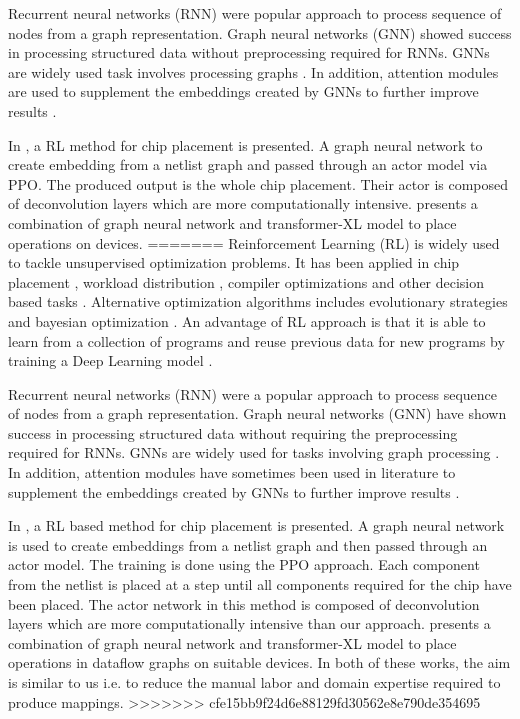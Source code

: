 Recurrent neural networks (RNN) \cite{hochreiter1996lstm} were popular approach to process sequence of nodes from a graph representation. 
Graph neural networks (GNN) \cite{gori2005new} showed success in processing structured data without preprocessing required for RNNs.
GNNs are widely used task involves processing graphs \cite{Zhou_compileGNN, zhou2019gdp}. 
In addition, attention modules are used to supplement the embeddings created by GNNs to further improve results \cite{addanki2019placeto}.

In \cite{mirhoseini2020chip}, a RL method for chip placement is presented. 
A graph neural network to create embedding from a netlist graph and passed through an actor model via PPO. 
The produced output is the whole chip placement. 
Their actor is composed of deconvolution layers which are more computationally intensive. 
\cite{zhou2019gdp} presents a combination of graph neural network and transformer-XL model to place operations on devices. 
=======
Reinforcement Learning (RL) is widely used to tackle unsupervised optimization problems. It has been applied in chip placement \cite{mirhoseini2020chip}, 
workload distribution \cite{Mirhoseini_placementRNN, addanki2019placeto, zhou2019gdp}, compiler optimizations \cite{Zhou_compileGNN} and 
other decision based tasks \cite{kormushev2013reinforcement, ZophL16_NASRL}. Alternative optimization algorithms includes 
evolutionary strategies \cite{Zhichao_ESNAS} and bayesian optimization \cite{shi2020learned}. An advantage of RL approach is that it is able to learn from a collection of programs and reuse previous data for new programs by training a Deep Learning model \cite{zhou2019gdp}.

Recurrent neural networks (RNN) \cite{hochreiter1996lstm} were a popular approach to process sequence of nodes from a graph representation. 
Graph neural networks (GNN) \cite{gori2005new} have shown success in processing structured data without requiring the preprocessing required for RNNs.
GNNs are widely used for tasks involving graph processing \cite{Zhou_compileGNN, zhou2019gdp}. 
In addition, attention modules have sometimes been used in literature to supplement the embeddings created by GNNs to further improve results \cite{addanki2019placeto}.

In \cite{mirhoseini2020chip}, a RL based method for chip placement is presented. A graph neural network is used to create embeddings from a netlist graph and then passed through an actor model. The training is done using the PPO approach. Each component from the netlist is placed at a step until all components required for the chip have been placed. The actor network in this method is composed of deconvolution layers which are more computationally intensive than our approach. 
\cite{zhou2019gdp} presents a combination of graph neural network and transformer-XL model to place operations in dataflow graphs on suitable devices.
In both of these works, the aim is similar to us i.e. to reduce the manual labor and domain expertise required to produce mappings.
>>>>>>> cfe15bb9f24d6e88129fd30562e8e790de354695

